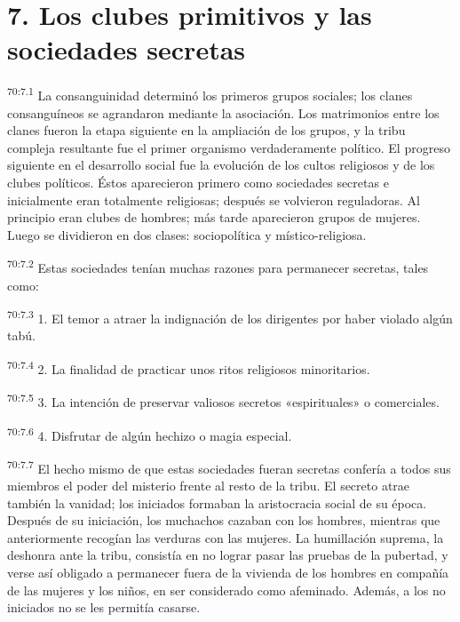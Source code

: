 \section*{7. Los clubes primitivos y las sociedades secretas}
\par
\textsuperscript{70:7.1} La consanguinidad determinó los primeros grupos sociales; los clanes consanguíneos se agrandaron mediante la asociación. Los matrimonios entre los clanes fueron la etapa siguiente en la ampliación de los grupos, y la tribu compleja resultante fue el primer organismo verdaderamente político. El progreso siguiente en el desarrollo social fue la evolución de los cultos religiosos y de los clubes políticos. Éstos aparecieron primero como sociedades secretas e inicialmente eran totalmente religiosas; después se volvieron reguladoras. Al principio eran clubes de hombres; más tarde aparecieron grupos de mujeres. Luego se dividieron en dos clases: sociopolítica y místico-religiosa.

\par
\textsuperscript{70:7.2} Estas sociedades tenían muchas razones para permanecer secretas, tales como:

\par
\textsuperscript{70:7.3} 1. El temor a atraer la indignación de los dirigentes por haber violado algún tabú.

\par
\textsuperscript{70:7.4} 2. La finalidad de practicar unos ritos religiosos minoritarios.

\par
\textsuperscript{70:7.5} 3. La intención de preservar valiosos secretos «espirituales» o comerciales.

\par
\textsuperscript{70:7.6} 4. Disfrutar de algún hechizo o magia especial.

\par
\textsuperscript{70:7.7} El hecho mismo de que estas sociedades fueran secretas confería a todos sus miembros el poder del misterio frente al resto de la tribu. El secreto atrae también la vanidad; los iniciados formaban la aristocracia social de su época. Después de su iniciación, los muchachos cazaban con los hombres, mientras que anteriormente recogían las verduras con las mujeres. La humillación suprema, la deshonra ante la tribu, consistía en no lograr pasar las pruebas de la pubertad, y verse así obligado a permanecer fuera de la vivienda de los hombres en compañía de las mujeres y los niños, en ser considerado como afeminado. Además, a los no iniciados no se les permitía casarse.

